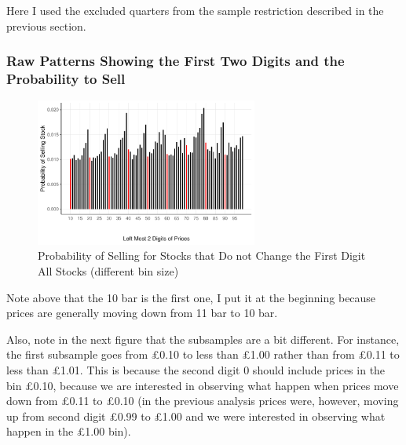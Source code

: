 Here I used the excluded quarters from the sample restriction described in the previous section.

\subsubsection{Raw Patterns Showing the First Two Digits and the Probability to Sell}

\begin{figure}[hbt!]
	\centering%
	\caption{Probability of Selling  for Stocks that Do not Change the First Digit \\ All Stocks (different bin size)}%
	\label{fig:}%
	\includegraphics[width=0.65\textwidth]{figures/2left_decrease.pdf}
	\fignote{}
\end{figure}

Note above that the 10 bar is the first one, I put it at the beginning because prices are generally moving down from 11 bar to 10 bar.

Also, note in the next figure that the subsamples are a bit different. For instance, the first subsample goes from £0.10 to less than £1.00 rather than from £0.11 to less than £1.01. This is because the second digit 0 should include prices in the bin £0.10, because we are interested in observing what happen when prices  move down from £0.11 to £0.10 (in the previous analysis prices were, however, moving up from second digit £0.99 to £1.00 and we were interested in observing what happen in the £1.00 bin).


